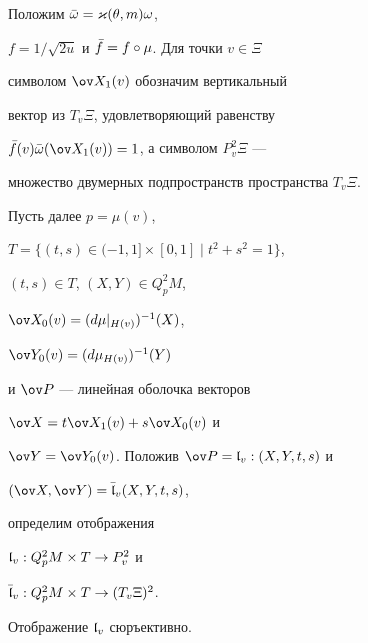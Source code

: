 Положим $\Bar\omega=\varkappa(\theta,m)\omega$, 


$f=1/\sqrt{2u}$ и $\Bar f=f\circ\mu$. Для точки $v\in\Xi$ 


символом $\ov X_1(v)$ обозначим вертикальный 


вектор из $T_v\Xi$, удовлетворяющий равенству 


$\Bar f(v)\Bar\omega(\ov X_1(v))=1$, а символом $P^2_v\Xi$ --- 


множество двумерных подпространств пространства $T_v\Xi$. 


 


Пусть далее $p=\mu(v)$, 


$T=\{(t,s)\in(-1,1]\times[0,1]\mid t^2+s^2=1\}$, 


$(t,s)\in T$, $(X,Y)\in Q^2_pM$, 


$\ov X_0(v)=(d\mu|_{H(v)})^{-1}(X)$, 


$\ov Y_0(v)=(d\mu_{H(v)})^{-1}(Y)$ 


и $\ov P$ --- линейная оболочка векторов 


$\ov X=t\ov X_1(v)+s\ov X_0(v)$ и 


$\ov Y=\ov Y_0(v)$. Положив $\ov P=\frak l_v:(X,Y,t,s)$ и 


$(\ov X,\ov Y)=\Bar{\frak l}_v(X,Y,t,s)$, 


определим отображения 


$\frak l_v:Q^2_pM\times T\to P^2_v$ и 


$\Bar{\frak l}_v:Q^2_pM\times T\to(T_v\Xi)^2$. 


 


\begin{lem} Отображение $\frak l_v$ сюръективно. 


\end{lem} 


 


